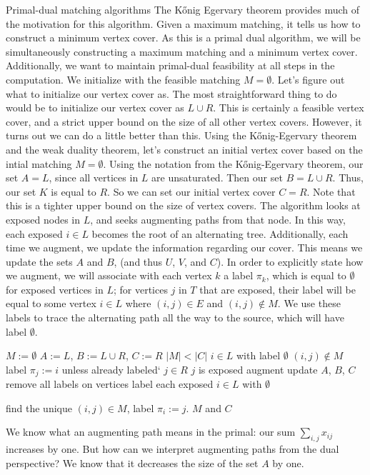 \documentclass[11pt]{article}
\renewcommand{\'}{^{'}}
\renewcommand{\gets}{:=}
\begin{document}
\begin{section}{Primal-dual matching algorithms}
	The K\H{o}nig Egervary theorem provides much of the motivation for this algorithm. Given a 
	maximum matching, it tells us how to construct a minimum vertex cover. As this is a primal dual 
	algorithm, we will be simultaneously constructing a maximum matching and a minimum vertex 
	cover. Additionally, we want to maintain primal-dual feasibility at all steps in the 
	computation. 
	We initialize with the feasible matching $M = \emptyset$. Let's figure out what to initialize 
	our vertex cover as. The most straightforward thing to do would be to initialize our vertex 
	cover as $L\cup R$. This is certainly a feasible vertex cover, and a strict upper bound on 
	the size of all other vertex covers. However, it turns out we can do a little better than 
	this. Using the K\H{o}nig-Egervary theorem and the weak duality theorem, let's construct 
	an initial vertex cover based on the intial matching $M = \emptyset$. Using the notation 
	from the K\H{o}nig-Egervary theorem, our set $A = L$, since all vertices in $L$ are 
	unsaturated. Then our set $B = L\cup R$. Thus, our set $K$ is equal to $R$. So we can set our 
	initial vertex cover $C = R$. Note that this is a tighter upper bound on the size of vertex 
	covers.
	The algorithm looks at exposed nodes in $L$, and seeks augmenting paths from that node. In this 
	way, each exposed $i\in L$ becomes the root of an alternating tree. Additionally, each time 
	we augment, we update the information regarding our cover. This means we update the sets 
	$A$ and $B$, (and thus $U$, $V$, and $C$). 
	In order to explicitly state how we augment, we will associate with each vertex $k$ a label 
	$\pi_{k}$, which is equal to $\emptyset$ for exposed vertices in $L$; for vertices $j$ in $T$ 
	that are exposed, their label will be equal to some vertex $i\in L$ where $(i,j)\in E$ and 
	$(i,j)\notin M$. We use these labels to trace the alternating path all the way to the source, 
	which will have label $\emptyset$.
	\begin{codebox}
		\li $M \gets \emptyset$
		\li $A \gets L$, $B \gets L\cup R$, $C\gets R$
		\li \While $|M| < |C|$
			\Do
		\li		\For $i\in L$ with label $\emptyset$
					\Do
		\li				\For $(i,j)\notin M$
							\Do
		\li						label $\pi_{j} \gets i$ unless already 
								labeled`
							\End
					\End
		\li		\For $j\in R$
					\Do
		\li				\If $j$ is exposed
							\Then
		\li						augment
		\li						update $A$, $B$, $C$
		\li						remove all labels on vertices
		\li						label each exposed $i\in L$ with 
								$\emptyset$
							
		\li					\Else
		\li						find the unique $(i,j)\in M$, label 
								$\pi_{i} \gets j$.
						\End
					\End
			\End
		\li \Return $M$ and $C$
	\end{codebox}
	We know what an augmenting path means in the primal: our sum $\sum_{i,j} x_{ij}$ increases by 
	one. But how can we interpret augmenting paths from the dual perspective? We know that it 
	decreases the size of the set $A$ by one. 



\end{section}
\end{document}

